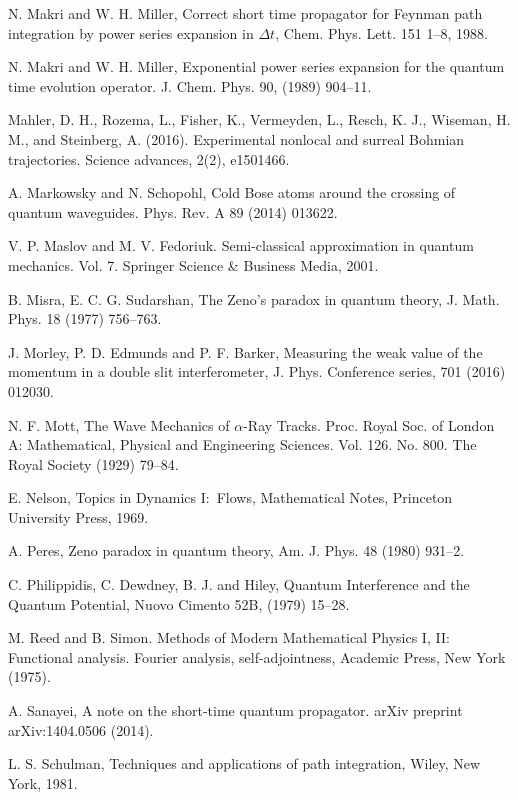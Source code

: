 \documentclass[12pt]{article}%
\begin{document}
\begin{thebibliography}{99}
N. Makri and W. H. Miller, Correct short time propagator for
Feynman path integration by power series expansion in $\Delta t$, Chem. Phys.
Lett. 151 1--8, 1988.

N. Makri and W. H. Miller, Exponential power series
expansion for the quantum time evolution operator. J. Chem. Phys. 90, (1989) 904--11.

Mahler, D. H., Rozema, L., Fisher, K., Vermeyden, L., Resch,
K. J., Wiseman, H. M., and Steinberg, A. (2016). Experimental nonlocal and
surreal Bohmian trajectories. Science advances, 2(2), e1501466.

A. Markowsky and N. Schopohl, Cold Bose atoms around the
crossing of quantum waveguides. Phys. Rev. A 89 (2014) 013622.

V. P. Maslov and M. V. Fedoriuk. Semi-classical approximation in
quantum mechanics. Vol. 7. Springer Science \& Business Media, 2001.

B. Misra, E. C. G. Sudarshan, The Zeno's paradox in quantum
theory, J. Math. Phys. 18 (1977) 756--763.

J. Morley, P. D. Edmunds and P. F. Barker, Measuring the
weak value of the momentum in a double slit interferometer, J. Phys.
Conference series, 701 (2016) 012030.

N. F. Mott, The Wave Mechanics of $\alpha$-Ray Tracks. Proc.
Royal Soc. of London A: Mathematical, Physical and Engineering Sciences. Vol.
126. No. 800. The Royal Society (1929) 79--84.

E. Nelson, Topics in Dynamics I:\ Flows, Mathematical Notes,
Princeton University Press, 1969.

A. Peres, Zeno paradox in quantum theory, Am. J. Phys. 48
(1980) 931--2.

C. Philippidis, C. Dewdney, B. J. and Hiley, Quantum
Interference and the Quantum Potential, Nuovo Cimento 52B, (1979) 15--28.

M. Reed and B. Simon. Methods of Modern Mathematical
Physics I, II: Functional analysis. Fourier analysis, self-adjointness,
Academic Press, New York (1975).

A. Sanayei, A note on the short-time quantum propagator. arXiv
preprint arXiv:1404.0506 (2014).

L. S. Schulman, Techniques and applications of path
integration, Wiley, New York, 1981.


\end{thebibliography}
\end{document}
